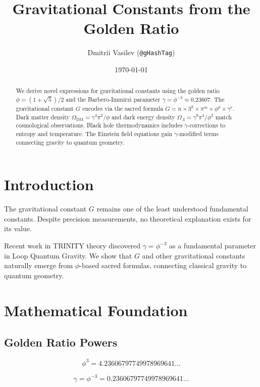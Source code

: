 \documentclass[12pt,a4paper]{article}
\title{Gravitational Constants from the Golden Ratio}
\author{Dmitrii Vasilev (\texttt{@gHashTag})}
\date{\today}
\begin{document}
\maketitle

\begin{abstract}
We derive novel expressions for gravitational constants using the golden ratio $\phi = (1+\sqrt{5})/2$ and the Barbero-Immirzi parameter $\gamma = \phi^{-3} \approx 0.23607$. The gravitational constant $G$ encodes via the sacred formula $G = n \times 3^k \times \pi^m \times \phi^p \times \gamma^r$. Dark matter density $\Omega_{\text{DM}} = \gamma^4 \pi^2/\phi$ and dark energy density $\Omega_\Lambda = \gamma^8 \pi^4/\phi^2$ match cosmological observations. Black hole thermodynamics includes $\gamma$-corrections to entropy and temperature. The Einstein field equations gain $\gamma$-modified terms connecting gravity to quantum geometry.
\end{abstract}

\section{Introduction}

The gravitational constant $G$ remains one of the least understood fundamental constants. Despite precision measurements, no theoretical explanation exists for its value.

Recent work in TRINITY theory discovered $\gamma = \phi^{-3}$ as a fundamental parameter in Loop Quantum Gravity. We show that $G$ and other gravitational constants naturally emerge from $\phi$-based sacred formulas, connecting classical gravity to quantum geometry.

\section{Mathematical Foundation}

\subsection{Golden Ratio Powers}

\begin{equation}
\phi^3 = 4.23606797749978969641...
\end{equation}

\begin{equation}
\gamma = \phi^{-3} = 0.23606797749978969641...
\end{equation}
\end{document}
